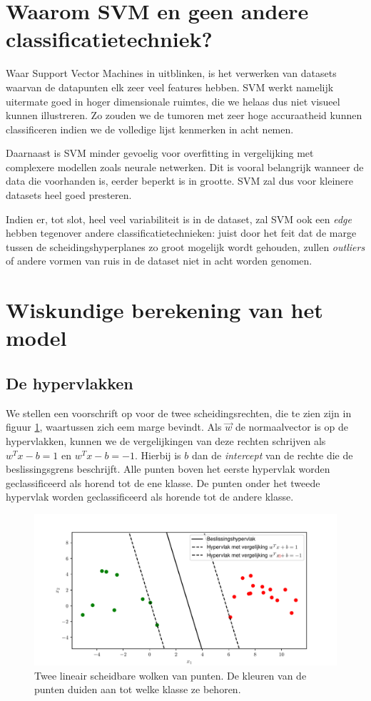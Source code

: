 \documentclass[TeamE-eindrapport]{subfiles}
\begin{document}
	\section{Waarom SVM en geen andere classificatietechniek?}
	
	Waar Support Vector Machines in uitblinken, is het verwerken van datasets waarvan de datapunten elk zeer veel features hebben. SVM werkt namelijk uitermate goed in hoger dimensionale ruimtes, die we helaas dus niet visueel kunnen illustreren. Zo zouden we de tumoren met zeer hoge accuraatheid kunnen classificeren indien we de volledige lijst kenmerken in acht nemen.
	
	Daarnaast is SVM minder gevoelig voor overfitting in vergelijking met complexere modellen zoals neurale netwerken. Dit is vooral belangrijk wanneer de data die voorhanden is, eerder beperkt is in grootte. SVM zal dus voor kleinere datasets heel goed presteren.
	
	Indien er, tot slot, heel veel variabiliteit is in de dataset, zal SVM ook een \textit{edge} hebben tegenover andere classificatietechnieken: juist door het feit dat de marge tussen de scheidingshyperplanes zo groot mogelijk wordt gehouden, zullen \textit{outliers} of andere vormen van ruis in de dataset niet in acht worden genomen.
	
	\section{Wiskundige berekening van het model}
	
	\subsection{De hypervlakken}
	
	We stellen een voorschrift op voor de twee scheidingsrechten, die te zien zijn in figuur \ref{fig:svm}, waartussen zich eem marge bevindt. Als \(\vec{w}\) de normaalvector is op de hypervlakken, kunnen we de vergelijkingen van deze rechten schrijven als \(w^Tx-b=1\) en \(w^Tx-b=-1\). Hierbij is \(b\) dan de \textit{intercept} van de rechte die de beslissingsgrens beschrijft. Alle punten boven het eerste hypervlak worden geclassificeerd als horend tot de ene klasse. De punten onder het tweede hypervlak worden geclassificeerd als horende tot de andere klasse.
	
	\begin{figure}[h!]
		\centering
		\includegraphics[width=.7\textwidth]{svm-afbeelding}
		\caption{Twee lineair scheidbare wolken van punten. De kleuren van de punten duiden aan tot welke klasse ze behoren.}
		\label{fig:svm}
	\end{figure}
	
\end{document}
